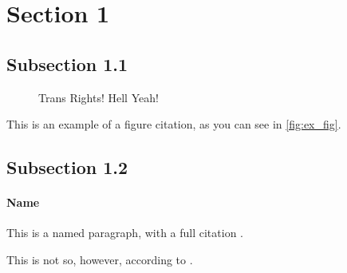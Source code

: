 
\section{Section 1}
\subsection{Subsection 1.1}

\begin{figure}[h]
    \centering
    
    \caption{Trans Rights! Hell Yeah!}
    \label{fig:ex_fig}
\end{figure}

This is an example of a figure citation, as you can see in \autoref{fig:ex_fig}.

\subsection{Subsection 1.2}
\paragraph{Name} This is a named paragraph, with a full citation \parencite{example_article}.

This is not so, however, according to \textcite[p.4]{example_book}.

\kant
